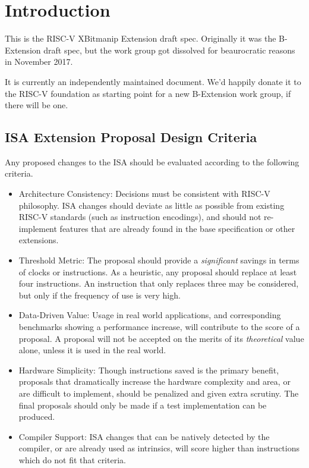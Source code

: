 \chapter{Introduction}

This is the RISC-V XBitmanip Extension draft spec. Originally it was the
B-Extension draft spec, but the work group got dissolved for beaurocratic
reasons in November 2017.

It is currently an independently maintained document. We'd happily donate
it to the RISC-V foundation as starting point for a new B-Extension work
group, if there will be one.

\section{ISA Extension Proposal Design Criteria}

Any proposed changes to the ISA should be evaluated according to the following
criteria.

\begin{itemize}
\item
  Architecture Consistency: Decisions must be consistent with RISC-V
  philosophy. ISA changes should deviate as little as possible from
  existing RISC-V standards (such as instruction encodings), and should
  not re-implement features that are already found in the base
  specification or other extensions.
\item
  Threshold Metric: The proposal should provide a \emph{significant}
  savings in terms of clocks or instructions. As a heuristic, any
  proposal should replace at least four instructions. An instruction
  that only replaces three may be considered, but only if the frequency
  of use is very high.
\item
  Data-Driven Value: Usage in real world applications, and corresponding
  benchmarks showing a performance increase, will contribute to the
  score of a proposal. A proposal will not be accepted on the merits of
  its \emph{theoretical} value alone, unless it is used in the real
  world.
\item
  Hardware Simplicity: Though instructions saved is the primary benefit,
  proposals that dramatically increase the hardware complexity and area,
  or are difficult to implement, should be penalized and given extra
  scrutiny. The final proposals should only be made if a test
  implementation can be produced.
\item
  Compiler Support: ISA changes that can be natively detected by the
  compiler, or are already used as intrinsics, will score higher than
  instructions which do not fit that criteria.
\end{itemize}

